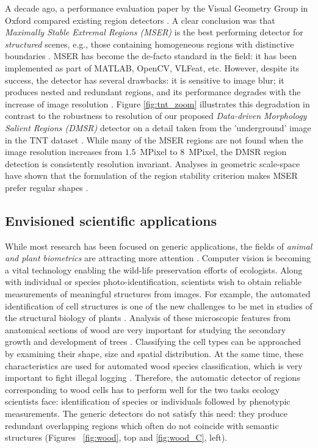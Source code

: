 \documentclass[conference,compsoc]{IEEEtran}
\begin{document}
A decade ago, a performance evaluation paper by the Visual Geometry Group in Oxford compared existing region detectors \cite{Mikolajczyk:2005}. 
A clear conclusion was that {\em  Maximally Stable Extremal Regions (MSER)} is the best performing detector for {\em structured} scenes, e.g., those containing homogeneous regions with distinctive boundaries \cite{Matas2002BMVC}. MSER has become the de-facto standard in the field: it has been implemented as part of MATLAB, OpenCV, VLFeat, etc. However, despite its success, the detector has several drawbacks: it is sensitive to image blur; it produces nested and redundant regions, and its performance degrades with the increase of image resolution \cite{CorRos2013}. Figure \ref{fig:tnt_zoom} illustrates this degradation in contrast to the robustness to resolution of our proposed {\em Data-driven Morphology Salient Regions (DMSR)} detector on a detail taken from the 'underground' image in the TNT dataset \cite{CorRos2013}. While many of the MSER regions are not found when the image resolution increases from $1.5$~MPixel to $8$~MPixel, the DMSR region detection is consistently resolution invariant. Analyses in geometric scale-space have shown that the formulation of the region stability criterion makes MSER prefer regular shapes \cite{Kimmel11}.


\subsection{Envisioned scientific applications}
While most research has been focused on generic applications, the
 fields of {\em animal and plant biometrics} are attracting more attention \cite{Kuehl2013, leafsnap_eccv2012}. Computer vision is becoming a vital technology enabling the wild-life preservation efforts of ecologists. Along with individual or species photo-identification, scientists wish to obtain reliable measurements of meaningful structures from images. For example, the automated identification of cell structures is one of the new challenges to be met in studies of the structural biology of plants \cite{Quelhas2011}. Analysis of these microscopic features from anatomical sections of wood are very important for studying the secondary growth and development of trees \cite{Brunel2014}. Classifying the cell types can be approached by examining their shape, size and spatial distribution. At the same time, these characteristics are used for automated wood species classification, which is very important to fight illegal logging \cite{Gasson2011}. Therefore, the  automatic detector of regions corresponding to wood cells has to perform well for the two tasks ecology scientists face: identification of species or individuals followed by phenotypic measurements. The generic detectors do not satisfy this need: they produce redundant overlapping regions which often do not coincide with semantic structures (Figures ~\ref{fig:wood}, top and \ref{fig:wood_C}, left).
\end{document}
